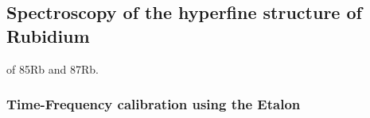 \documentclass{article}
\begin{document}
\subsection{Spectroscopy of the hyperfine structure of Rubidium}
of 85Rb and 87Rb.
\subsubsection{Time-Frequency calibration using the Etalon}
\end{document}
